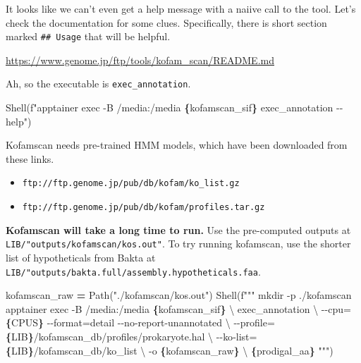 \documentclass[
]{book}
\newenvironment{Shaded}{\begin{snugshade}}{\end{snugshade}}
\newcommand{\CharTok}[1]{\textcolor[rgb]{0.31,0.60,0.02}{#1}}
\newcommand{\NormalTok}[1]{#1}
\newcommand{\OperatorTok}[1]{\textcolor[rgb]{0.81,0.36,0.00}{\textbf{#1}}}
\newcommand{\SpecialCharTok}[1]{\textcolor[rgb]{0.81,0.36,0.00}{\textbf{#1}}}
\newcommand{\SpecialStringTok}[1]{\textcolor[rgb]{0.31,0.60,0.02}{#1}}
\newcommand{\StringTok}[1]{\textcolor[rgb]{0.31,0.60,0.02}{#1}}
\providecommand{\tightlist}{%
  \setlength{\itemsep}{0pt}\setlength{\parskip}{0pt}}
\begin{document}
It looks like we can't even get a help message with a naiive call to the tool.
Let's check the documentation for some clues. Specifically, there is short section marked \texttt{\#\#\ Usage} that will be helpful.

\url{https://www.genome.jp/ftp/tools/kofam_scan/README.md}

Ah, so the executable is \texttt{exec\_annotation}.

\begin{Shaded}
\begin{Highlighting}[numbers=left,,]
\NormalTok{Shell(}\SpecialStringTok{f"apptainer exec {-}B /media:/media }\SpecialCharTok{\{}\NormalTok{kofamscan\_sif}\SpecialCharTok{\}}\SpecialStringTok{ exec\_annotation {-}{-}help"}\NormalTok{)}
\end{Highlighting}
\end{Shaded}

Kofamscan needs pre-trained HMM models, which have been downloaded from these links.

\begin{itemize}
\tightlist
\item
  \texttt{ftp://ftp.genome.jp/pub/db/kofam/ko\_list.gz}
\item
  \texttt{ftp://ftp.genome.jp/pub/db/kofam/profiles.tar.gz}
\end{itemize}

\textbf{Kofamscan will take a long time to run.} Use the pre-computed outputs at \texttt{LIB/"outputs/kofamscan/kos.out"}.
To try running kofamscan, use the shorter list of hypotheticals from Bakta at \texttt{LIB/"outputs/bakta.full/assembly.hypotheticals.faa}.

\begin{Shaded}
\begin{Highlighting}[numbers=left,,]
\NormalTok{kofamscan\_raw }\OperatorTok{=}\NormalTok{ Path(}\StringTok{"./kofamscan/kos.out"}\NormalTok{)}
\NormalTok{Shell(}\SpecialStringTok{f"""}
\SpecialStringTok{mkdir {-}p ./kofamscan}
\SpecialStringTok{apptainer exec {-}B /media:/media }\SpecialCharTok{\{}\NormalTok{kofamscan\_sif}\SpecialCharTok{\}}\SpecialStringTok{ }\CharTok{\textbackslash{}}
\SpecialStringTok{    exec\_annotation }\CharTok{\textbackslash{}}
\SpecialStringTok{        {-}{-}cpu=}\SpecialCharTok{\{}\NormalTok{CPUS}\SpecialCharTok{\}}\SpecialStringTok{ {-}{-}format=detail {-}{-}no{-}report{-}unannotated }\CharTok{\textbackslash{}}
\SpecialStringTok{        {-}{-}profile=}\SpecialCharTok{\{}\NormalTok{LIB}\SpecialCharTok{\}}\SpecialStringTok{/kofamscan\_db/profiles/prokaryote.hal }\CharTok{\textbackslash{}}
\SpecialStringTok{        {-}{-}ko{-}list=}\SpecialCharTok{\{}\NormalTok{LIB}\SpecialCharTok{\}}\SpecialStringTok{/kofamscan\_db/ko\_list }\CharTok{\textbackslash{}}
\SpecialStringTok{        {-}o }\SpecialCharTok{\{}\NormalTok{kofamscan\_raw}\SpecialCharTok{\}}\SpecialStringTok{ }\CharTok{\textbackslash{}}
\SpecialStringTok{        }\SpecialCharTok{\{}\NormalTok{prodigal\_aa}\SpecialCharTok{\}}
\SpecialStringTok{"""}\NormalTok{)}
\end{Highlighting}
\end{Shaded}
\end{document}
